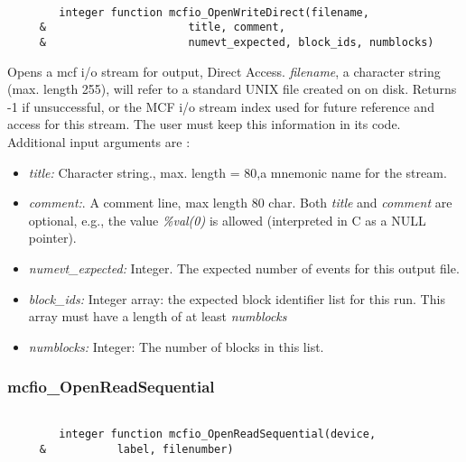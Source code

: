 \begin{verbatim}

        integer function mcfio_OpenWriteDirect(filename, 
     &                      title, comment,
     &                      numevt_expected, block_ids, numblocks)

\end{verbatim}
 Opens a mcf i/o stream for output, Direct Access. {\em filename}, a  character
 string (max. length 255), will refer to a  standard UNIX file created on
 on disk. Returns -1 if unsuccessful, or the MCF i/o stream index 
 used for future reference and access for this stream. The user must keep
 this information in its code. Additional input arguments are : 
\begin{itemize}
\item {\em title:} Character string., max. length = 80,a mnemonic name for the 
stream.
\item {\em comment:}. A comment line, max length 80 char. Both {\em title }
and {\em comment} are optional, e.g., the value {\em \%val(0)} is allowed
(interpreted in C as a NULL pointer).
\item {\em numevt\_expected:} Integer.  The expected number of events for this
output  file.
\item {\em block\_ids:} Integer array: the expected block identifier list for 
this run. This array must have a length of at least {\em numblocks}
\item {\em numblocks:} Integer: The number of blocks in this list.
\end{itemize}

 
\subsubsection{mcfio\_OpenReadSequential}

\begin{verbatim}

        integer function mcfio_OpenReadSequential(device,
     &           label, filenumber)

\end{verbatim}

